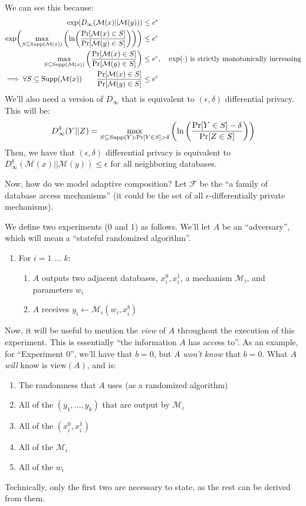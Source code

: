 \documentclass{article}
\theoremstyle{definition}
\begin{document}
We can see this because:
\begin{align*}
\exp(D_\infty(\mathcal{M}(x)||\mathcal{M}(y))) &\leq e^\epsilon \\
\exp(\max_{S\subseteq\text{Supp}(\mathcal{M}(x))}\pqty{\ln(\frac{\Pr[\mathcal{M}(x)\in S]}{\Pr[\mathcal{M}(y)\in S]})})&\leq e^\epsilon \\
\max_{S\subseteq\text{Supp}(\mathcal{M}(x))}\pqty{\frac{\Pr[\mathcal{M}(x)\in S]}{\Pr[\mathcal{M}(y)\in S]}}&\leq e^\epsilon,\quad \exp(\cdot)\text{ is strictly monotonically increasing} \\
\implies \forall S\subseteq\text{Supp}(\mathcal{M}(x))\qquad \frac{\Pr[\mathcal{M}(x)\in S]}{\Pr[\mathcal{M}(y)\in S]} &\leq e^\epsilon
\end{align*}
We'll also need a version of $D_\infty$ that is equivalent to $(\epsilon,\delta)$ differential privacy.
This will be:
\begin{equation}
D_\infty^\delta (Y||Z) = \max_{S\subseteq\text{Supp}(Y):\Pr[Y\in S] > \delta}\pqty{\ln\pqty{\frac{\Pr[Y\in S] - \delta}{\Pr[Z\in S]}}}
\end{equation}
Then, we have that $(\epsilon,\delta)$ differential privacy is equivalent to $D^\delta_\infty (\mathcal{M}(x)||\mathcal{M}(y)) \leq \epsilon$ for all neighboring databases.


Now, how do we model adaptive composition?
Let $\mathcal{F}$ be the ``a family of database access mechanisms'' (it could be the set of all $\epsilon$-differentially private mechanisms).

We define two experiments ($0$ and $1$) as follows.
We'll let $A$ be an ``adversary'', which will mean a ``stateful randomized algorithm''.

\begin{enumerate}
\item For $i = 1$ ... $k$:
\begin{enumerate}
\item $A$ outputs two adjacent databases, $x_i^0, x_i^1$, a mechanism $\mathcal{M}_i$, and parameters $w_i$
\item $A$ receives $y_i\leftarrow\mathcal{M}_i(w_i,x_i^b)$
\end{enumerate}
\end{enumerate}
Now, it will be useful to mention the \emph{view} of $A$ throughout the execution of this experiment.
This is essentially ``the information $A$ has access to''.
As an example, for ``Experiment $0$'', we'll have that $b = 0$, but $A$ \emph{won't know} that $b = 0$.
What $A$ \emph{will} know is $\text{view}(A)$, and is:
\begin{enumerate}
\item The randomness that $A$ uses (as a randomized algorithm)
\item All of the $(y_1,\dots,y_k)$ that are output by $\mathcal{M}_i$
\item All of the $(x_i^0,x_i^1)$
\item All of the $\mathcal{M}_i$
\item All of the $w_i$
\end{enumerate}
Technically, only the first two are necessary to state, as the rest can be derived from them.
\end{document}
